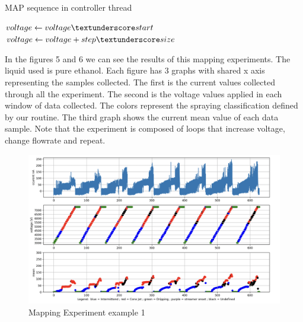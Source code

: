     \begin{algorithm}
        \caption{MAP sequence in controller thread}\label{alg:cap}
        \begin{algorithmic}
              
                \State {}
                \State $voltage \gets voltage\textunderscore start$
                 
                    \State {}
                    \State {}
                    \State $voltage \gets voltage + step\textunderscore size$
                \EndWhile
            \EndFor
        \EndProcedure

        \end{algorithmic}
    \end{algorithm}

    In the figures 5 and 6 we can see the results of this mapping experiments. The liquid used is pure ethanol. 
    Each figure has 3 graphs with shared x axis representing the samples collected. The first is the current values collected through all the experiment.
    The second is the voltage values applied in each window of data collected. The colors represent the spraying classification defined by our routine.
    The third graph shows the current mean value of each data sample.
    Note that the experiment is composed of loops that increase voltage, change flowrate and repeat.

    \begin{figure}[H]
        \center
        \includegraphics[width=15cm]{images/map2Data.png}
        \caption{Mapping Experiment example 1 }
    \end{figure}

